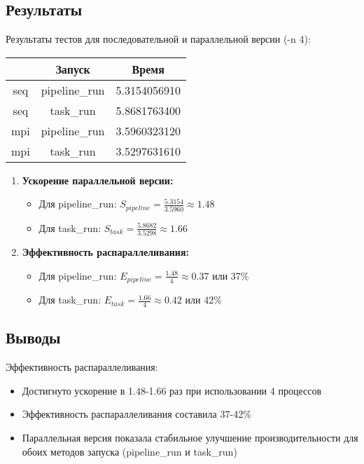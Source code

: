 \documentclass[12pt]{article}
\begin{document}
\subsection{Результаты}
Результаты тестов для последовательной и параллельной версии (-n 4):

\begin{center}
\begin{tabular}{|c|c|c|}
    \hline
        & Запуск & Время\\
    \hline
    seq & pipeline\_run & 5.3154056910 \\
    \hline    
    seq & task\_run & 5.8681763400 \\
    \hline
    mpi & pipeline\_run & 3.5960323120 \\
    \hline
    mpi & task\_run & 3.5297631610 \\
    \hline
\end{tabular}
\end{center}
\begin{enumerate}
    \item \textbf{Ускорение параллельной версии:}
    \begin{itemize}
        \item Для pipeline\_run: $S_{pipeline} = \frac{5.3154}{3.5960} \approx 1.48$
        \item Для task\_run: $S_{task} = \frac{5.8682}{3.5298} \approx 1.66$
    \end{itemize}

    \item \textbf{Эффективность распараллеливания:}
    \begin{itemize}
        \item Для pipeline\_run: $E_{pipeline} = \frac{1.48}{4} \approx 0.37$ или 37\%
        \item Для task\_run: $E_{task} = \frac{1.66}{4} \approx 0.42$ или 42\%
    \end{itemize}
\end{enumerate}

\subsection{Выводы}
Эффективность распараллеливания:
\begin{itemize}
    \item Достигнуто ускорение в 1.48-1.66 раз при использовании 4 процессов
    \item Эффективность распараллеливания составила 37-42\%
    \item Параллельная версия показала стабильное улучшение производительности для обоих методов запуска (pipeline\_run и task\_run)
\end{itemize}
\newpage
\end{document}
